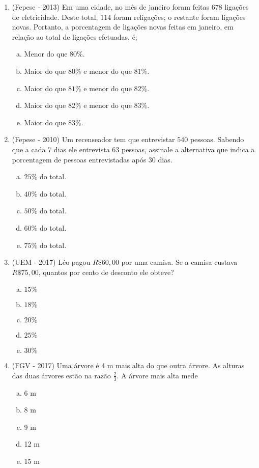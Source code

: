 \begin{enumerate}
    \item (Fepese - 2013)  Em uma cidade, no mês de janeiro foram feitas $678$ ligações de eletricidade. Deste total, $114$ foram religações; o restante foram ligações novas. Portanto, a porcentagem de ligações novas feitas em janeiro, em relação ao total de ligações efetuadas, é;
    \begin{enumerate}[a)]
    \item Menor do que $80\%$.
    \item Maior do que $80\%$ e menor do que $81\%$.
    \item Maior do que $81\%$ e menor do que $82\%$.
    \item Maior do que $82\%$ e menor do que $83\%$.
    \item Maior do que $83\%$.
    \end{enumerate}


    \item (Fepese - 2010) Um recenseador tem que entrevistar $540$ pessoas. Sabendo que a cada $7$ dias ele entrevista $63$ pessoas, assinale a alternativa que indica a porcentagem de pessoas entrevistadas após $30$ dias.
    \begin{enumerate}[a)]
    \item $25\%$ do total.
    \item $40\%$ do total.
    \item $50\%$ do total.
    \item $60\%$ do total.
    \item $75\%$ do total.
    \end{enumerate}

    \item (UEM - 2017) Léo pagou $R\$ 60,00$ por uma camisa. Se a camisa custava $R\$ 75,00$, quantos por cento de desconto ele obteve?
    \begin{enumerate}[a)]
    \item $15 \%$
    \item $18 \%$
    \item $20 \%$
    \item $25 \%$
    \item $30 \%$
    \end{enumerate}

    \item (FGV - 2017) Uma árvore é 4 m mais alta do que outra árvore. As alturas das duas árvores estão na razão $\frac{2}{3}$. A árvore mais alta mede
    \begin{enumerate}[a)]
    \item 6 m
    \item 8 m
    \item 9 m
    \item 12 m
    \item 15 m
    \end{enumerate}



\end{enumerate}
